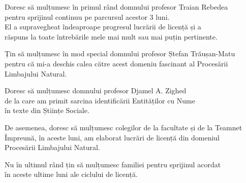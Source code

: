 \vspace*{7cm}
\begin{center}
Doresc să mulțumesc în primul rând domnului profesor Traian Rebedea\\
pentru sprijinul continuu pe parcursul acestor 3 luni.\\
El a supravegheat îndeaproape progresul lucrării de licență și a\\
răspuns la toate întrebările mele mai mult sau mai puțin pertinente.
\end{center}

\vspace{0.6cm}
\begin{center}
Țin să mulțumesc în mod special domnului profesor Ștefan Trăușan-Matu\\
pentru că mi-a deschis calea către acest domeniu fascinant al Procesării Limbajului Natural.
\end{center}

\vspace{0.6cm}
\begin{center}
Doresc să mulțumesc domnului profesor Djamel A. Zighed \\
de la care am primit sarcina identificării Entităților cu Nume \\
în texte din Științe Sociale.
\end{center}

\vspace{0.6cm}
\begin{center}
De asemenea, doresc să mulțumesc colegilor de la facultate și de la Teamnet\\
Împreună, în aceste luni, am elaborat lucrări de licență din domeniul\\
Procesării Limbajului Natural.
\end{center}


\vspace{0.6cm}
\begin{center}
Nu în ultimul rând țin să mulțumesc familiei pentru sprijinul acordat\\
în aceste ultime luni ale ciclului de licență.
\end{center}
